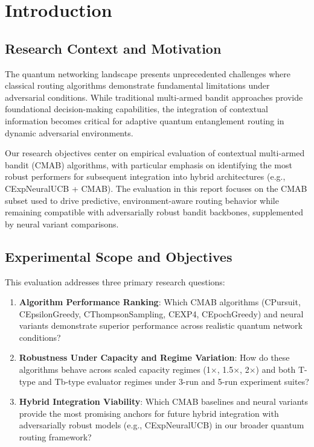 \documentclass[12pt,a4paper]{article}
\begin{document}
\newpage
\section{Introduction}

\subsection{Research Context and Motivation}

The quantum networking landscape presents unprecedented challenges where classical routing algorithms demonstrate fundamental limitations under adversarial conditions. While traditional multi-armed bandit approaches provide foundational decision-making capabilities, the integration of contextual information becomes critical for adaptive quantum entanglement routing in dynamic adversarial environments.

Our research objectives center on empirical evaluation of contextual multi-armed bandit (CMAB) algorithms, with particular emphasis on identifying the most robust performers for subsequent integration into hybrid architectures (e.g., CExpNeuralUCB + CMAB). The evaluation in this report focuses on the CMAB subset used to drive predictive, environment-aware routing behavior while remaining compatible with adversarially robust bandit backbones, supplemented by neural variant comparisons.

\subsection{Experimental Scope and Objectives}

This evaluation addresses three primary research questions:

\begin{enumerate}
\item \textbf{Algorithm Performance Ranking}: Which CMAB algorithms (CPursuit, CEpsilonGreedy, CThompsonSampling, CEXP4, CEpochGreedy) and neural variants demonstrate superior performance across realistic quantum network conditions?
\item \textbf{Robustness Under Capacity and Regime Variation}: How do these algorithms behave across scaled capacity regimes (1$\times$, 1.5$\times$, 2$\times$) and both T-type and Tb-type evaluator regimes under 3-run and 5-run experiment suites?
\item \textbf{Hybrid Integration Viability}: Which CMAB baselines and neural variants provide the most promising anchors for future hybrid integration with adversarially robust models (e.g., CExpNeuralUCB) in our broader quantum routing framework?
\end{enumerate}
\end{document}
